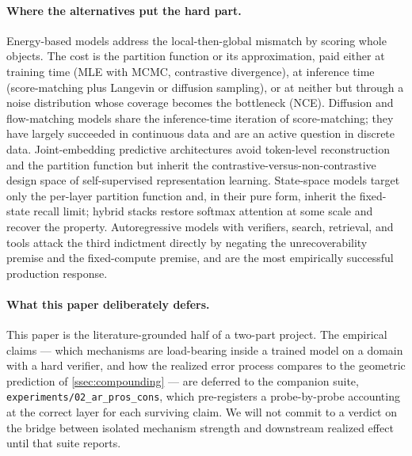 \paragraph{Where the alternatives put the hard part.}
Energy-based models address the local-then-global mismatch by scoring whole objects.
The cost is the partition function or its approximation, paid either at training time (MLE with MCMC, contrastive divergence), at inference time (score-matching plus Langevin or diffusion sampling), or at neither but through a noise distribution whose coverage becomes the bottleneck (NCE).
Diffusion and flow-matching models share the inference-time iteration of score-matching;
they have largely succeeded in continuous data and are an active question in discrete data.
Joint-embedding predictive architectures avoid token-level reconstruction and the partition function but inherit the contrastive-versus-non-contrastive design space of self-supervised representation learning.
State-space models target only the per-layer partition function and, in their pure form, inherit the fixed-state recall limit;
hybrid stacks restore softmax attention at some scale and recover the property.
Autoregressive models with verifiers, search, retrieval, and tools attack the third indictment directly by negating the unrecoverability premise and the fixed-compute premise, and are the most empirically successful production response.

\paragraph{What this paper deliberately defers.}
This paper is the literature-grounded half of a two-part project.
The empirical claims --- which mechanisms are load-bearing inside a trained model on a domain with a hard verifier, and how the realized error process compares to the geometric prediction of \cref{ssec:compounding} --- are deferred to the companion suite, \texttt{experiments/02\_ar\_pros\_cons}, which pre-registers a probe-by-probe accounting at the correct layer for each surviving claim.
We will not commit to a verdict on the bridge between isolated mechanism strength and downstream realized effect until that suite reports.

